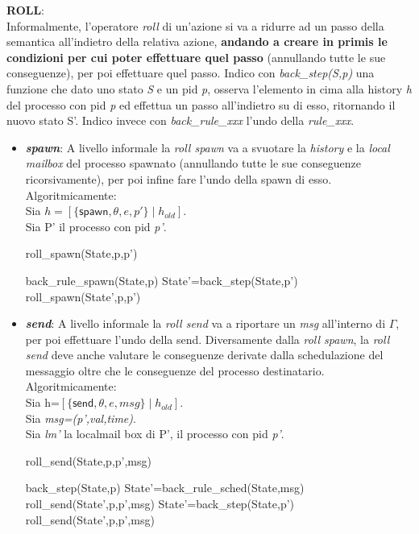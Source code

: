 \documentclass[background.tex]{subfiles}
\begin{document}
\textbf{ROLL}:\\
	Informalmente, l'operatore \textit{roll} di un'azione si va a ridurre ad un passo della semantica all'indietro della relativa azione, \textbf{andando a creare in primis le condizioni per cui poter effettuare quel passo} (annullando tutte le sue conseguenze), per poi effettuare quel passo.
	Indico con \textit{back\_step(S,p)} una funzione che dato uno stato \textit{S} e un pid \textit{p}, osserva l'elemento in cima alla history \textit{h} del processo con pid \textit{p} ed effettua un passo all'indietro su di esso, ritornando il nuovo stato S'.
	Indico invece con \textit{back\_rule\_xxx} l'undo della \textit{rule\_xxx}.
	\begin{itemize}
		\item \textit{\textbf{spawn}}: A livello informale la \textit{roll spawn} va a svuotare la \textit{history} e la \textit{local mailbox} del processo spawnato (annullando tutte le sue conseguenze ricorsivamente), per poi infine fare l'undo della spawn di esso. Algoritmicamente:\\
		Sia $\displaystyle h=[\{\mathsf{spawn},\theta,e,p'\} \mid h_{old}]$.\\
		Sia P' il processo con pid \textit{p'}.
		\begin{algorithm}[H]
		\caption{roll\_spawn(State,p,p')}
		\begin{algorithmic}
			\RETURN back\_rule\_spawn(State,p)
		\ELSE
			\STATE State'=back\_step(State,p')
			\RETURN roll\_spawn(State',p,p')
		\ENDIF
		\end{algorithmic}
		\end{algorithm}
		\item \textit{\textbf{send}}: 
		A livello informale la \textit{roll send} va a riportare un \textit{msg} all'interno di $\Gamma$, per poi effettuare l'undo della send. Diversamente dalla \textit{roll spawn}, la \textit{roll send} deve anche valutare le conseguenze derivate dalla schedulazione del messaggio oltre che le conseguenze del processo destinatario. Algoritmicamente:\\
		Sia h=$\displaystyle [\{\mathsf{send},\theta,e,msg\} \mid h_{old}]$.\\
		Sia \textit{msg=(p',val,time)}.\\
		Sia \textit{lm'} la localmail box di P', il processo con pid \textit{p'}.
		\begin{algorithm}[H]
		\caption{roll\_send(State,p,p',msg)}
		\begin{algorithmic}
		\IF { msg $\in$ $\Gamma$} 
			\RETURN back\_step(State,p)
		\ELSE
			\IF { lm'==[msg $\mid$ $lm_{rest}$]} 
				\STATE State'=back\_rule\_sched(State,msg)
				\RETURN roll\_send(State',p,p',msg)
			\ELSE
				\STATE State'=back\_step(State,p')
				\RETURN roll\_send(State',p,p',msg)
			\ENDIF
		\ENDIF
		\end{algorithmic}
		\end{algorithm}
	\end{itemize}
\end{document}
